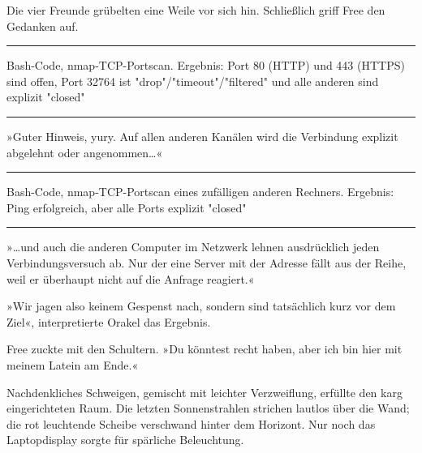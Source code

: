 Die vier Freunde grübelten eine Weile vor sich hin. Schließlich griff Free den Gedanken auf.

\noindent \parbox{\textwidth}{ \vspace{3ex} \hrule \vspace{3ex}

    \begin{tiny}
    \begin{ttfamily}

\noindent Bash-Code, nmap-TCP-Portscan. Ergebnis: Port 80 (HTTP) und 443 (HTTPS) sind offen, Port 32764 ist "drop"/"timeout"/"filtered" und alle anderen sind explizit "closed"

    \end{ttfamily}
    \end{tiny}

\vspace{3ex} \hrule \vspace{3ex} }

»Guter Hinweis, yury. Auf allen anderen Kanälen wird die Verbindung explizit abgelehnt oder angenommen…«

\noindent \parbox{\textwidth}{ \vspace{3ex} \hrule \vspace{3ex}

    \begin{tiny}
    \begin{ttfamily}

\noindent Bash-Code, nmap-TCP-Portscan eines zufälligen anderen Rechners. Ergebnis: Ping erfolgreich, aber alle Ports explizit "closed"

    \end{ttfamily}
    \end{tiny}

\vspace{3ex} \hrule \vspace{3ex} }

»…und auch die anderen Computer im Netzwerk lehnen ausdrücklich jeden Verbindungsversuch ab. Nur der eine Server mit der Adresse  fällt aus der Reihe, weil er überhaupt nicht auf die Anfrage reagiert.«

»Wir jagen also keinem Gespenst nach, sondern sind tatsächlich kurz vor dem Ziel«, interpretierte Orakel das Ergebnis.

Free zuckte mit den Schultern. »Du könntest recht haben, aber ich bin hier mit meinem Latein am Ende.«

Nachdenkliches Schweigen, gemischt mit leichter Verzweiflung, erfüllte den karg eingerichteten Raum. Die letzten Sonnenstrahlen strichen lautlos über die Wand; die rot leuchtende Scheibe verschwand hinter dem Horizont. Nur noch das Laptopdisplay sorgte für spärliche Beleuchtung.

